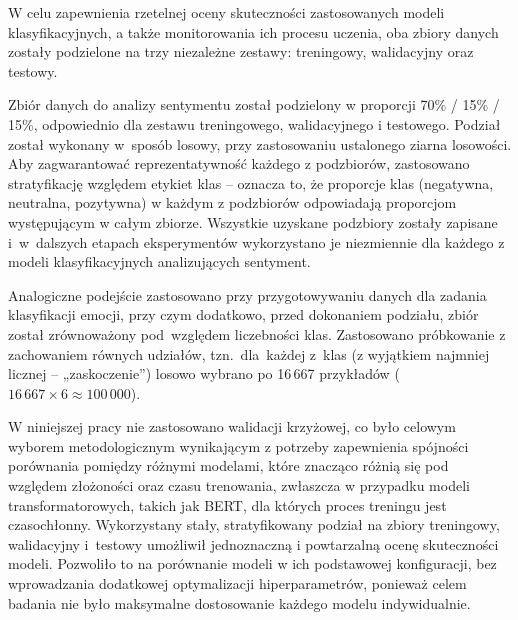 W celu zapewnienia rzetelnej oceny skuteczności zastosowanych modeli klasyfikacyjnych, a także monitorowania ich procesu uczenia, oba zbiory danych zostały podzielone na trzy niezależne zestawy: treningowy, walidacyjny oraz testowy. 

Zbiór danych do analizy sentymentu został podzielony w proporcji 70\% / 15\% / 15\%, odpowiednio dla zestawu treningowego, walidacyjnego i testowego. Podział został wykonany w~sposób losowy, przy zastosowaniu ustalonego ziarna losowości. Aby zagwarantować reprezentatywność każdego z podzbiorów, zastosowano stratyfikację względem etykiet klas -- oznacza to, że proporcje klas (negatywna, neutralna, pozytywna) w każdym z podzbiorów odpowiadają proporcjom występującym w całym zbiorze. Wszystkie uzyskane podzbiory zostały zapisane i~w~dalszych etapach eksperymentów wykorzystano je niezmiennie dla każdego z modeli klasyfikacyjnych analizujących sentyment.

Analogiczne podejście zastosowano przy przygotowywaniu danych dla zadania klasyfikacji emocji, przy czym dodatkowo, przed dokonaniem podziału, zbiór został zrównoważony pod~względem liczebności klas. Zastosowano próbkowanie z zachowaniem równych udziałów, tzn.~dla~każdej z~klas (z wyjątkiem najmniej licznej -- „zaskoczenie”) losowo wybrano po 16\,667 przykładów ($16\,667 \times 6 \approx 100\,000$). 

W niniejszej pracy nie zastosowano walidacji krzyżowej, co było celowym wyborem metodologicznym wynikającym z potrzeby zapewnienia spójności porównania pomiędzy różnymi modelami, które znacząco różnią się pod względem złożoności oraz czasu trenowania, zwłaszcza w przypadku modeli transformatorowych, takich jak BERT, dla których proces treningu jest czasochłonny. Wykorzystany stały, stratyfikowany podział na zbiory treningowy, walidacyjny i~testowy umożliwił jednoznaczną i powtarzalną ocenę skuteczności modeli. Pozwoliło to na porównanie modeli w ich podstawowej konfiguracji, bez wprowadzania dodatkowej optymalizacji hiperparametrów, ponieważ celem badania nie było maksymalne dostosowanie każdego modelu indywidualnie.

\endinput